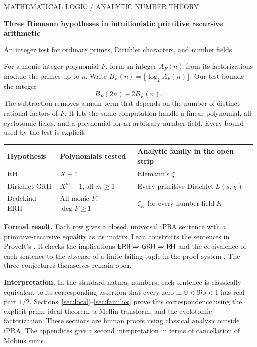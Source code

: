 \documentclass[11pt]{article}
\begin{document}
\thispagestyle{plain}
{\sffamily\small\textcolor{accent}{MATHEMATICAL LOGIC \enspace / \enspace ANALYTIC NUMBER THEORY}}\par
\vspace{8pt}
{\LARGE\bfseries\color{ink} Three Riemann hypotheses in intuitionistic primitive recursive arithmetic\par}
\vspace{6pt}
{\large An integer test for ordinary primes, Dirichlet characters, and number fields\par}
\vspace{7pt}{\small November 20, 2026}\par
\medskip\noindent
For a monic integer polynomial \(F\), form an integer \(A_F(n)\) from its factorizations modulo the primes up to \(n\). Write \(B_F(n)=\lfloor\log_2 A_F(n)\rfloor\). Our test bounds the integer
\[
                       B_F(2n)-2B_F(n).
\]
The subtraction removes a main term that depends on the number of distinct rational factors of \(F\). It lets the same computation handle a linear polynomial, all cyclotomic fields, and a polynomial for an arbitrary number field. Every bound used by the test is explicit.
\begin{center}\small
\begin{tabular}{@{}lll@{}}\toprule
Hypothesis & Polynomials tested & Analytic family in the open strip\\\midrule
RH & \(X-1\) & Riemann's \(\zeta\)\\
Dirichlet GRH & \(X^m-1\), all \(m\ge1\) & Every primitive Dirichlet \(L(s,\chi)\)\\
Dedekind ERH & All monic \(F\), \(\deg F\ge1\) & \(\zeta_K\) for every number field \(K\)\\\bottomrule
\end{tabular}
\end{center}
\noindent
\textbf{Formal result.} Each row gives a closed, universal iPRA sentence with a primitive-recursive equality as its matrix. Lean constructs the sentences in ProveIt's . It checks the implications \(\mathsf{ERH}\Rightarrow\mathsf{GRH}\Rightarrow\mathsf{RH}\) and the equivalence of each sentence to the absence of a finite failing tuple in the proof system . The three conjectures themselves remain open.

\smallskip\noindent
\textbf{Interpretation.} In the standard natural numbers, each sentence is classically equivalent to its corresponding assertion that every zero in \(0<\Re s<1\) has real part \(1/2\). Sections~\ref{sec:local}--\ref{sec:families} prove this correspondence using the explicit prime ideal theorem, a Mellin transform, and the cyclotomic factorization. These sections are human proofs using classical analysis outside iPRA. The appendices give a second interpretation in terms of cancellation of M\"obius sums.
\end{document}
